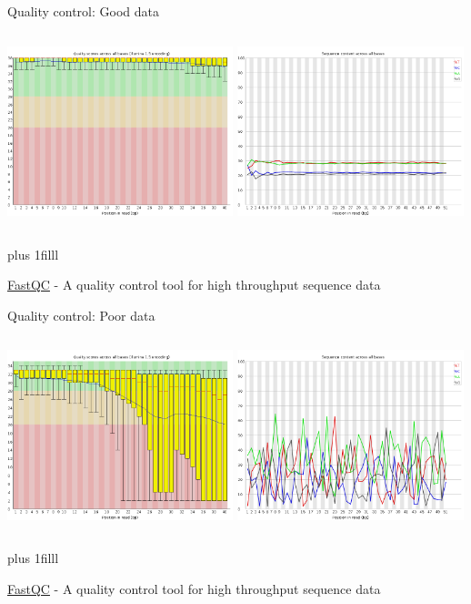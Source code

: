 \documentclass[10pt]{beamer}
\newcommand{\credit}[1]{{\vskip0pt plus 1filll \par \raggedleft \scriptsize \mdseries \color{mDarkBrown} #1 \par}}
\begin{document}
\begin{frame}{Quality control: Good data}
	\begin{columns}[T]
		\column{\dimexpr\paperwidth-10pt}
		\includegraphics[width=0.493\textwidth]{./figures/fastqc-good.png}
		\includegraphics[width=0.493\textwidth]{./figures/fastqc-good2.png}
	\end{columns}
	\credit{\href{https://www.bioinformatics.babraham.ac.uk/projects/fastqc/}{FastQC} - A quality control tool for high throughput sequence data}
\end{frame}

\begin{frame}{Quality control: Poor data}
	\begin{columns}[T]
		\column{\dimexpr\paperwidth-10pt}
		\includegraphics[width=0.493\textwidth]{./figures/fastqc-ugly.png}
		\includegraphics[width=0.493\textwidth]{./figures/fastqc-ugly2.png}
	\end{columns}
	\credit{\href{https://www.bioinformatics.babraham.ac.uk/projects/fastqc/}{FastQC} - A quality control tool for high throughput sequence data}
\end{frame}
\end{document}
